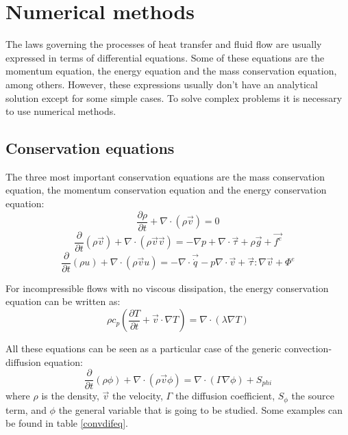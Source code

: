 \chapter{Numerical methods}

The laws governing the processes of heat transfer and fluid flow are usually expressed in terms of differential equations. Some of these equations are the momentum equation, the energy equation and the mass conservation equation, among others. However, these expressions usually don’t have an analytical solution except for some simple cases. To solve complex problems it is necessary to use numerical methods.

\section{Conservation equations}
\label{ConservationEquations}
The three most important conservation equations are the mass conservation equation, the momentum conservation equation and the energy conservation equation:
\begin{equation}
\frac{\partial\rho}{\partial t}+\nabla\cdot\left(\rho\vec{v}\right)=0
\end{equation}
\begin{equation}
\frac{\partial}{\partial t}\left(\rho\vec{v}\right)+\nabla\cdot\left(\rho\vec{v}\vec{v}\right)=-\nabla p+\nabla\cdot\vec{\tau}+\rho\vec{g}+\vec{f^{e}}
\end{equation}
\begin{equation}
\frac{\partial}{\partial t}(\rho u)+\nabla\cdot\left(\rho\vec{v}u\right)=-\nabla\cdot\vec{\dot{q}}-p\nabla\cdot\vec{v}+\vec{\tau}:\nabla\vec{v}+\Phi^{e}
\end{equation}

For incompressible flows with no viscous dissipation, the energy conservation equation can be written as:
\begin{equation}
\rho c_{p}\left(\frac{\partial T}{\partial t}+\vec{v}\cdot\nabla T\right)=\nabla\cdot\left(\lambda\nabla T\right)
\end{equation}

All these equations can be seen as a particular case of the generic convection-diffusion equation:
\begin{equation}
\frac{\partial}{\partial t}\left(\rho\phi\right)+\nabla\cdot\left(\rho\vec{v}\phi\right)=\nabla\cdot\left(\Gamma\nabla\phi\right)+S_{phi}
\end{equation}
where $\rho$ is the density, $\vec{v}$ the velocity, $\Gamma$ the diffusion coefficient, $S_{\phi}$ the source term, and $\phi$ the general variable that is going to be studied. Some examples can be found in table \ref{convdifeq}.

